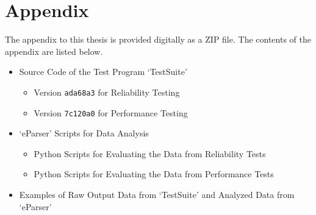 \chapter{Appendix}
The appendix to this thesis is provided digitally as a ZIP file. The contents of the appendix are listed below.

\begin{itemize}
	\item Source Code of the Test Program `TestSuite'
		\begin{itemize}
			\item Version \texttt{ada68a3} for Reliability Testing
			\item Version \texttt{7c120a0} for Performance Testing
		\end{itemize}
	\item `eParser' Scripts for Data Analysis
		\begin{itemize}
			\item Python Scripts for Evaluating the Data from Reliability Tests
			\item Python Scripts for Evaluating the Data from Performance Tests
		\end{itemize}
	\item Examples of Raw Output Data from `TestSuite' and Analyzed Data from `eParser'
\end{itemize}

